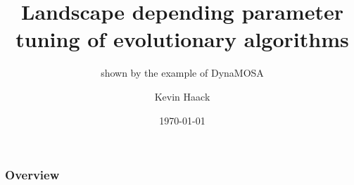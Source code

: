 \documentclass[aspectratio=169]{beamer}
\title{Landscape depending parameter tuning of evolutionary algorithms}
\subtitle{shown by the example of DynaMOSA}
\author{Kevin Haack}
\institute{Software Engineering}
\date{\today}
\begin{document}
	
{
	\hnititlebackground 
	\begin{frame}
		\titlepage
	\end{frame}
}

{
	\begin{frame}
		\frametitle{Overview}
		\tableofcontents
	\end{frame}
}






{
	\hnifullbackground 
	
	\begin{frame}
		\textbf{\Huge{\centerline{}}}
	\end{frame}
}
\end{document}
